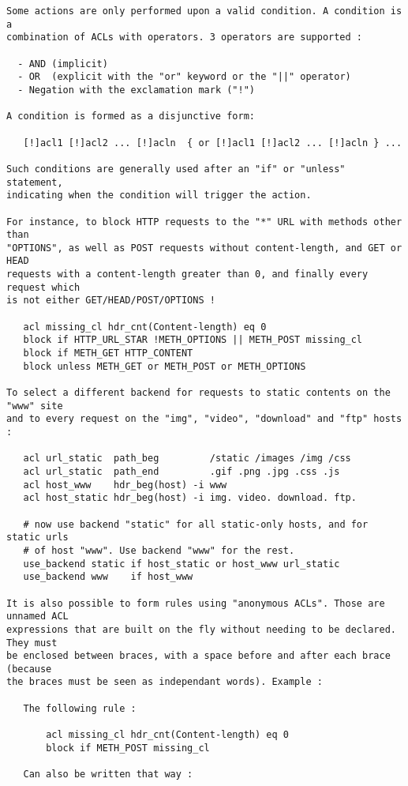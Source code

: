 \begin{verbatim}
Some actions are only performed upon a valid condition. A condition is a
combination of ACLs with operators. 3 operators are supported :

  - AND (implicit)
  - OR  (explicit with the "or" keyword or the "||" operator)
  - Negation with the exclamation mark ("!")

A condition is formed as a disjunctive form:

   [!]acl1 [!]acl2 ... [!]acln  { or [!]acl1 [!]acl2 ... [!]acln } ...

Such conditions are generally used after an "if" or "unless" statement,
indicating when the condition will trigger the action.

For instance, to block HTTP requests to the "*" URL with methods other than
"OPTIONS", as well as POST requests without content-length, and GET or HEAD
requests with a content-length greater than 0, and finally every request which
is not either GET/HEAD/POST/OPTIONS !

   acl missing_cl hdr_cnt(Content-length) eq 0
   block if HTTP_URL_STAR !METH_OPTIONS || METH_POST missing_cl
   block if METH_GET HTTP_CONTENT
   block unless METH_GET or METH_POST or METH_OPTIONS

To select a different backend for requests to static contents on the "www" site
and to every request on the "img", "video", "download" and "ftp" hosts :

   acl url_static  path_beg         /static /images /img /css
   acl url_static  path_end         .gif .png .jpg .css .js
   acl host_www    hdr_beg(host) -i www
   acl host_static hdr_beg(host) -i img. video. download. ftp.

   # now use backend "static" for all static-only hosts, and for static urls
   # of host "www". Use backend "www" for the rest.
   use_backend static if host_static or host_www url_static
   use_backend www    if host_www

It is also possible to form rules using "anonymous ACLs". Those are unnamed ACL
expressions that are built on the fly without needing to be declared. They must
be enclosed between braces, with a space before and after each brace (because
the braces must be seen as independant words). Example :

   The following rule :

       acl missing_cl hdr_cnt(Content-length) eq 0
       block if METH_POST missing_cl

   Can also be written that way :


\end{verbatim}
